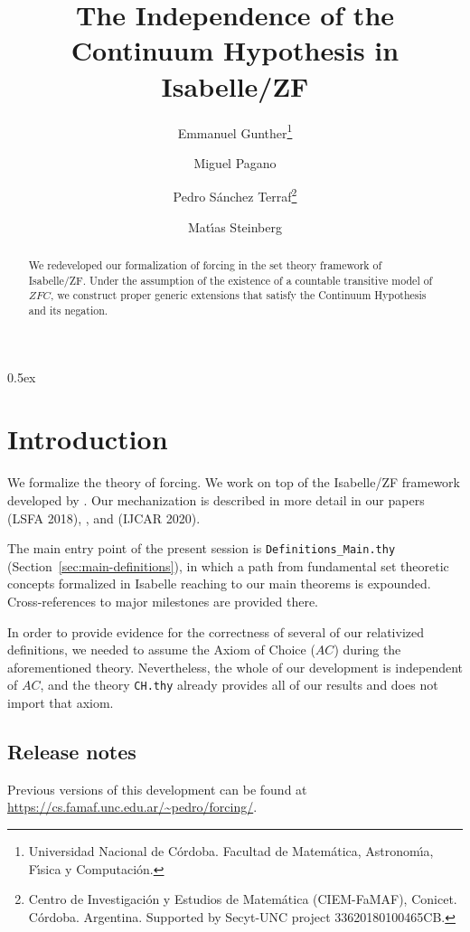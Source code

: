 \documentclass[11pt,a4paper,english]{article}
\newcommand{\theory}[1]{\texttt{#1}}
\newcommand{\axiomas}[1]{\mathit{#1}}
\newcommand{\ZFC}{\axiomas{ZFC}}
\newcommand{\AC}{\axiomas{AC}}
\begin{document}
\title{The Independence of the Continuum Hypothesis in Isabelle/ZF}
\author{Emmanuel Gunther\thanks{Universidad Nacional de C\'ordoba. 
    Facultad de Matem\'atica, Astronom\'{\i}a,  F\'{\i}sica y
    Computaci\'on.}
  \and
  Miguel Pagano\footnotemark[1]
  \and
  Pedro S\'anchez Terraf\footnotemark[1] \thanks{Centro de Investigaci\'on y Estudios de Matem\'atica
    (CIEM-FaMAF), Conicet. C\'ordoba. Argentina.
    Supported by Secyt-UNC project 33620180100465CB.}
  \and
  Mat\'{\i}as Steinberg\footnotemark[1]
}
\maketitle

\begin{abstract}
  We redeveloped our formalization of forcing in the set theory framework of
  Isabelle/ZF. Under the assumption of the existence of a countable
  transitive model of $\ZFC$, we construct proper generic extensions 
  that satisfy the Continuum Hypothesis and its negation.
\end{abstract}


\tableofcontents

\parindent 0pt\parskip 0.5ex

\section{Introduction}
We formalize the theory of forcing. We work on top of the Isabelle/ZF
framework developed by \citet{DBLP:journals/jar/PaulsonG96}. Our
mechanization is described in more detail in our papers
\cite{2018arXiv180705174G} (LSFA 2018), \cite{2019arXiv190103313G},
and \cite{2020arXiv200109715G} (IJCAR 2020).

The main entry point of the present session is
\theory{Definitions\_Main.thy} (Section~\ref{sec:main-definitions}),
in which a path from fundamental set
theoretic concepts formalized in Isabelle reaching to our main theorems
is expounded. Cross-references to major milestones are provided there.

In order to provide evidence for the correctness of several of our relativized
definitions, we needed to assume the Axiom of Choice ($\AC$) during the
aforementioned theory. Nevertheless, the whole of our development is
independent of $\AC$, and the theory \theory{CH.thy} already provides
all of our results and does not import that axiom.

\subsection*{Release notes}
\label{sec:release-notes}

Previous versions of this development can be found at
\url{https://cs.famaf.unc.edu.ar/~pedro/forcing/}.





\end{document}
